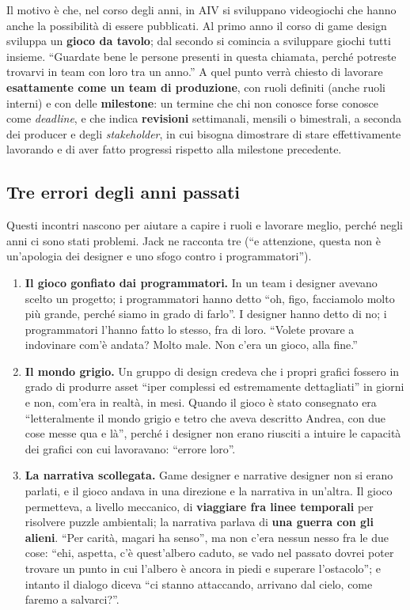 Il motivo è che, nel corso degli anni, in AIV si sviluppano videogiochi che
hanno anche la possibilità di essere pubblicati. Al primo anno il corso di
game design sviluppa un \textbf{gioco da tavolo}; dal secondo si comincia a
sviluppare giochi tutti insieme. ``Guardate bene le persone presenti in
questa chiamata, perché potreste trovarvi in team con loro tra un anno.'' A
quel punto verrà chiesto di lavorare \textbf{esattamente come un team di
produzione}, con ruoli definiti (anche ruoli interni) e con delle
\textbf{milestone}: un termine che chi non conosce forse conosce come
\emph{deadline}, e che indica \textbf{revisioni} settimanali, mensili o
bimestrali, a seconda dei producer e degli \emph{stakeholder}, in cui bisogna
dimostrare di stare effettivamente lavorando e di aver fatto progressi
rispetto alla milestone precedente.

\subsection{Tre errori degli anni passati}

Questi incontri nascono per aiutare a capire i ruoli e lavorare meglio,
perché negli anni ci sono stati problemi. Jack ne racconta tre (``e
attenzione, questa non è un'apologia dei designer e uno sfogo contro i
programmatori'').
\begin{enumerate}
  \item \textbf{Il gioco gonfiato dai programmatori.} In un team i designer
        avevano scelto un progetto; i programmatori hanno detto ``oh, figo,
        facciamolo molto più grande, perché siamo in grado di farlo''. I
        designer hanno detto di no; i programmatori l'hanno fatto lo stesso,
        fra di loro. ``Volete provare a indovinare com'è andata? Molto male.
        Non c'era un gioco, alla fine.''
  \item \textbf{Il mondo grigio.} Un gruppo di design credeva che i propri
        grafici fossero in grado di produrre asset ``iper complessi ed
        estremamente dettagliati'' in giorni e non, com'era in realtà, in
        mesi. Quando il gioco è stato consegnato era ``letteralmente il mondo
        grigio e tetro che aveva descritto Andrea, con due cose messe qua e
        là'', perché i designer non erano riusciti a intuire le capacità dei
        grafici con cui lavoravano: ``errore loro''.
  \item \textbf{La narrativa scollegata.} Game designer e narrative designer
        non si erano parlati, e il gioco andava in una direzione e la
        narrativa in un'altra. Il gioco permetteva, a livello meccanico, di
        \textbf{viaggiare fra linee temporali} per risolvere puzzle
        ambientali; la narrativa parlava di \textbf{una guerra con gli
        alieni}. ``Per carità, magari ha senso'', ma non c'era nessun nesso
        fra le due cose: ``ehi, aspetta, c'è quest'albero caduto, se vado nel
        passato dovrei poter trovare un punto in cui l'albero è ancora in
        piedi e superare l'ostacolo''; e intanto il dialogo diceva ``ci
        stanno attaccando, arrivano dal cielo, come faremo a salvarci?''.
\end{enumerate}


